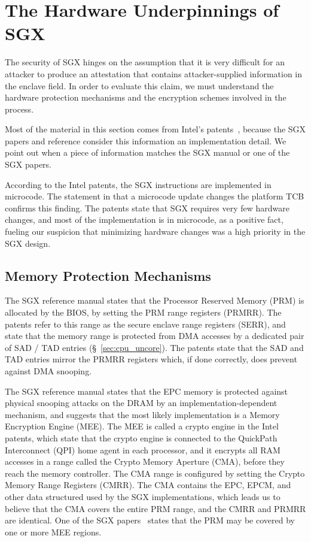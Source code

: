 \section{The Hardware Underpinnings of SGX}

The security of SGX hinges on the assumption that it is very difficult for an
attacker to produce an attestation that contains attacker-supplied information
in the enclave field. In order to evaluate this claim, we must understand the
hardware protection mechanisms and the encryption schemes involved in the
process.

Most of the material in this section comes from Intel's
patents~\cite{intel2013patent1, intel2013patent2}, because the SGX papers and
reference consider this information an implementation detail. We point out when
a piece of information matches the SGX manual or one of the SGX papers.

According to the Intel patents, the SGX instructions are implemented in
microcode. The statement in \cite{anati2013sgx} that a microcode update changes
the platform TCB confirms this finding. The patents state that SGX requires
very few hardware changes, and most of the implementation is in microcode, as a
positive fact, fueling our suspicion that minimizing hardware changes was a
high priority in the SGX design.


\subsection{Memory Protection Mechanisms}

The SGX reference manual states that the Processor Reserved Memory (PRM) is
allocated by the BIOS, by setting the PRM range registers (PRMRR). The patents
refer to this range as the secure enclave range registers (SERR), and state
that the memory range is protected from DMA accesses by a dedicated pair of
SAD / TAD entries (\S~\ref{sec:cpu_uncore}).
The patents state that the SAD and TAD entries mirror the PRMRR registers
which, if done correctly, does prevent against DMA snooping.

The SGX reference manual states that the EPC memory is protected against
physical snooping attacks on the DRAM by an implementation-dependent mechanism,
and suggests that the most likely implementation is a Memory Encryption Engine
(MEE). The MEE is called a crypto engine in the Intel patents, which state that
the crypto engine is connected to the QuickPath Interconnect (QPI) home agent
in each processor, and it encrypts all RAM accesses in a range called the
Crypto Memory Aperture (CMA), before they reach the memory controller. The CMA
range is configured by setting the Crypto Memory Range Registers (CMRR). The
CMA contains the EPC, EPCM, and other data structured used by the SGX
implementations, which leads us to believe that the CMA covers the entire PRM
range, and the CMRR and PRMRR are identical. One of the SGX
papers~\cite{mckeen2013sgx} states that the PRM may be covered by one or more
MEE regions.

